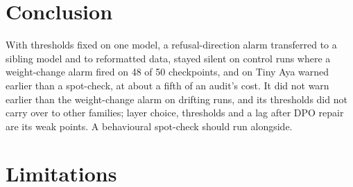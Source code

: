 \documentclass[11pt]{article}
\begin{document}
\section{Conclusion}

With thresholds fixed on one model, a refusal-direction alarm transferred to a sibling model and to reformatted data, stayed silent on control runs where a weight-change alarm fired on 48 of 50 checkpoints, and on Tiny Aya warned earlier than a spot-check, at about a fifth of an audit's cost. It did not warn earlier than the
weight-change alarm on drifting runs, and its thresholds did not carry over to other families; layer choice, thresholds and a lag after DPO repair
are its weak points. A behavioural spot-check should run alongside.

\section*{Limitations}
\end{document}
